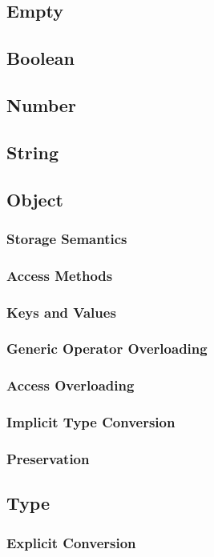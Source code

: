 \documentclass[12pt,letterpaper]{report}
\begin{document}
\subsection{Empty}
\subsection{Boolean}
\subsection{Number}
\subsection{String}
\subsection{Object}
\subsubsection{Storage Semantics}
\subsubsection{Access Methods}
\subsubsection{Keys and Values}    
\subsubsection{Generic Operator Overloading}    
\subsubsection{Access Overloading}
\subsubsection{Implicit Type Conversion}
\subsubsection{Preservation}
\subsection{Type}            
\subsubsection{Explicit Conversion}
\end{document}

